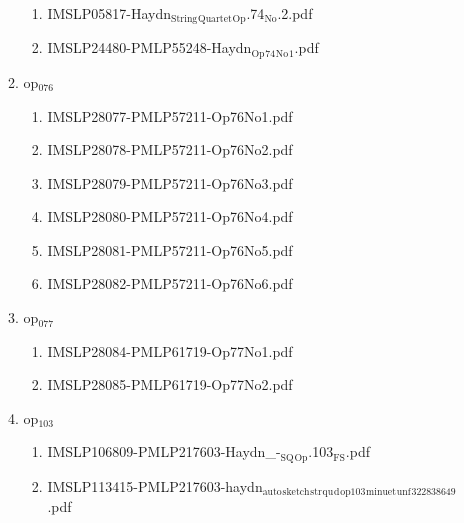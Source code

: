 \documentclass[11pt]{article}
\begin{document}
\begin{enumerate}
\begin{enumerate}
\begin{enumerate}
\item IMSLP05817-Haydn$_{\text{String}}$$_{\text{Quartet}}$$_{\text{Op}}$.74$_{\text{No}}$.2.pdf
\label{sec-1-1-1-1-44-38-6-15-4}

\item IMSLP24480-PMLP55248-Haydn$_{\text{Op}}$$_{\text{74}}$$_{\text{No}}$$_{\text{1}}$.pdf
\label{sec-1-1-1-1-44-38-6-15-5}
\end{enumerate}

\item op$_{\text{076}}$
\label{sec-1-1-1-1-44-38-6-16}
\begin{enumerate}
\item IMSLP28077-PMLP57211-Op76No1.pdf
\label{sec-1-1-1-1-44-38-6-16-1}

\item IMSLP28078-PMLP57211-Op76No2.pdf
\label{sec-1-1-1-1-44-38-6-16-2}

\item IMSLP28079-PMLP57211-Op76No3.pdf
\label{sec-1-1-1-1-44-38-6-16-3}

\item IMSLP28080-PMLP57211-Op76No4.pdf
\label{sec-1-1-1-1-44-38-6-16-4}

\item IMSLP28081-PMLP57211-Op76No5.pdf
\label{sec-1-1-1-1-44-38-6-16-5}

\item IMSLP28082-PMLP57211-Op76No6.pdf
\label{sec-1-1-1-1-44-38-6-16-6}
\end{enumerate}

\item op$_{\text{077}}$
\label{sec-1-1-1-1-44-38-6-17}
\begin{enumerate}
\item IMSLP28084-PMLP61719-Op77No1.pdf
\label{sec-1-1-1-1-44-38-6-17-1}

\item IMSLP28085-PMLP61719-Op77No2.pdf
\label{sec-1-1-1-1-44-38-6-17-2}
\end{enumerate}

\item op$_{\text{103}}$
\label{sec-1-1-1-1-44-38-6-18}
\begin{enumerate}
\item IMSLP106809-PMLP217603-Haydn\_-$_{\text{SQ}}$$_{\text{Op}}$.103$_{\text{FS}}$.pdf
\label{sec-1-1-1-1-44-38-6-18-1}

\item IMSLP113415-PMLP217603-haydn$_{\text{auto}}$$_{\text{sketch}}$$_{\text{str}}$$_{\text{qu}}$$_{\text{d}}$$_{\text{op103}}$$_{\text{minuet}}$$_{\text{unf}}$$_{\text{322838649}}$.pdf
\label{sec-1-1-1-1-44-38-6-18-2}
\end{enumerate}
\end{enumerate}


\end{enumerate}
\end{document}
